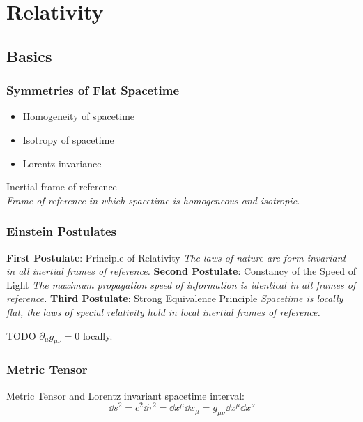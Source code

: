 \section{Relativity}
	\subsection{Basics}
		\subsubsection{Symmetries of Flat Spacetime}
			\begin{itemize}
				\item Homogeneity of spacetime
				\item Isotropy of spacetime
				\item Lorentz invariance
			\end{itemize}

			\noindent
			Inertial frame of reference \\
				\indent \textit{Frame of reference in which spacetime is homogeneous and isotropic.}

		\subsubsection{Einstein Postulates}
			\textbf{First Postulate}: Principle of Relativity \newline
				\indent \textit{The laws of nature are form invariant in all inertial frames of reference.}  \nl
			\textbf{Second Postulate}: Constancy of the Speed of Light \newline
				\indent \textit{The maximum propagation speed of information is identical in all frames of reference.}
				\label{post:c}\nl
			\textbf{Third Postulate}: Strong Equivalence Principle \newline
				\indent \textit{Spacetime is locally flat, \ie the laws of special relativity hold in local inertial frames of reference.}  \vsp
			
			TODO $\partial_\mu g_{\mu\nu} = 0$ locally. 

	\subsubsection{Metric Tensor}
		Metric Tensor and Lorentz invariant spacetime interval:
		\begin{equation}
			\dd s^2 = c^2 \dd \tau^2 = \dd x^\mu \dd x_\mu = g_{\mu\nu} \dd x^\mu \dd x^\nu
		\end{equation}

